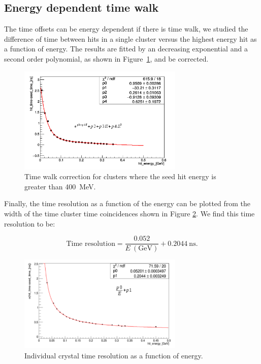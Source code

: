 \documentclass[review]{elsarticle}
\begin{document}
\subsection{Energy dependent time walk}

The time offsets can be energy dependent if there is time walk, we studied the difference of time between hits 
in a single cluster versus the highest energy hit as a function of energy. The 
results are fitted by an decreasing exponential and a second order polynomial,
as shown in Figure~\ref{TimeWalk}, and be corrected.


\begin{figure}[ht!]
\centering
\includegraphics[width=0.70\textwidth]{twalk.png}
\caption{Time walk correction for clusters where the seed hit energy is greater than 400~MeV.}
\label{TimeWalk}
\end{figure}


Finally, the time resolution as a function of the energy can be plotted from 
the width of the time cluster time coincidences shown in Figure \ref{TresoVSTime}. 
We find this time resolution to be:

\begin{equation}
\textrm{Time resolution}= \frac{0.052}{E~(\textrm{GeV})} + 0.2044~\textrm{ns}.
\label{eq}
\end{equation}


\begin{figure}[ht!]
\centering
\includegraphics[width=0.70\textwidth]{TimeResolution.png}
\caption{Individual crystal time resolution as a function of energy.}
\label{TresoVSTime}
\end{figure}
\end{document}
